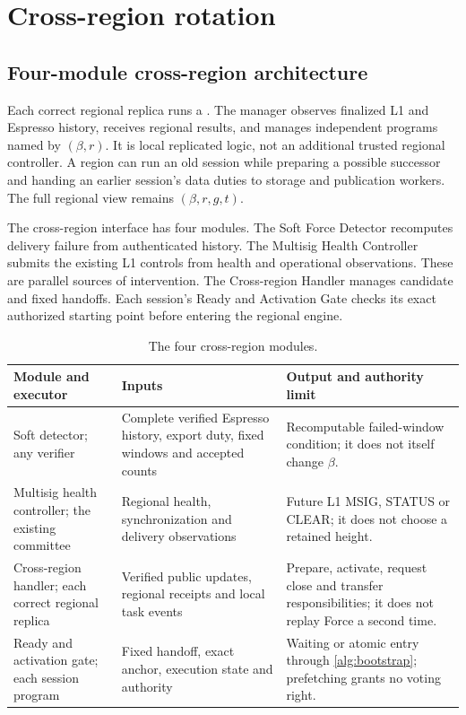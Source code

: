 \section{Cross-region rotation}
\label{sec:xprotocols}

\subsection{Four-module cross-region architecture}
\label{sec:runtime-modules}
Each correct regional replica runs a . The
manager observes finalized L1 and Espresso history, receives regional
results, and manages independent programs named by $(\beta,r)$.
It is local replicated logic, not an additional trusted regional
controller. A region can run an old session while preparing a possible
successor and handing an earlier session's data duties to storage and
publication workers. The full regional view remains $(\beta,r,g,t)$.

The cross-region interface has four modules. The Soft Force Detector
recomputes delivery failure from authenticated history. The Multisig
Health Controller submits the existing L1 controls from health and
operational observations. These are parallel sources of intervention.
The Cross-region Handler manages candidate and fixed handoffs. Each
session's Ready and Activation Gate checks its exact authorized starting
point before entering the regional engine.

\begin{table}[htbp]\centering\small
\caption{The four cross-region modules.}
\label{tab:runtime-modules}
\begin{tabularx}{\linewidth}{@{}p{.22\linewidth}Y Y@{}}\toprule
Module and executor & Inputs & Output and authority limit\\\midrule
Soft detector; any verifier & Complete verified Espresso history,
export duty, fixed windows and accepted counts & Recomputable failed-window
condition; it does not itself change $\beta$.\\
Multisig health controller; the existing committee & Regional health,
synchronization and delivery observations & Future L1 MSIG, STATUS or
CLEAR; it does not choose a retained height.\\
Cross-region handler; each correct regional replica & Verified public
updates, regional receipts and local task events & Prepare, activate,
request close and transfer responsibilities; it does not replay Force
a second time.\\
Ready and activation gate; each session program & Fixed handoff,
exact anchor, execution state and authority & Waiting or atomic entry
through \cref{alg:bootstrap}; prefetching grants no voting right.\\\bottomrule
\end{tabularx}
\end{table}

